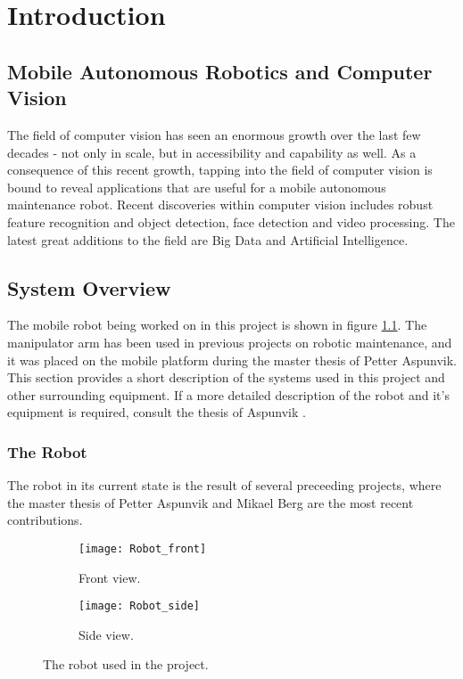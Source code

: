\chapter{Introduction}
\label{chp:introduction} 

\section{Mobile Autonomous Robotics and Computer Vision}

The field of computer vision has seen an enormous growth over the last few decades - not only in scale, but in accessibility and capability as well. As a consequence of this recent growth, tapping into the field of computer vision is bound to reveal applications that are useful for a mobile autonomous maintenance robot. Recent discoveries within computer vision includes robust feature recognition and object detection, face detection and video processing. The latest great additions to the field are Big Data and Artificial Intelligence.

\section{System Overview}

The mobile robot being worked on in this project is shown in figure \ref{fig:RobotFront}. The manipulator arm  has been used in previous projects on robotic maintenance, and it was placed on the mobile platform during the master thesis of Petter Aspunvik. This section provides a short description of the systems used in this project and other surrounding equipment. If a more detailed description of the robot and it's equipment is required, consult the thesis of Aspunvik \cite{aspunvik}.

\subsection{The Robot} 

The robot in its current state is the result of several preceeding projects, where the master thesis of Petter Aspunvik \cite{aspunvik} and Mikael Berg \cite{berg} are the most recent contributions. 

\begin{figure}
\centering
 \begin{subfigure}[b]{0.3\textwidth}
        \texttt{[image: Robot\_front]}
        \caption{Front view.}
        \label{fig:RobotFront}
    \end{subfigure}
    \begin{subfigure}[b]{0.65\textwidth}
        \texttt{[image: Robot\_side]}
        \caption{Side view.}
        \label{fig:RobotSide}
    \end{subfigure}
    \caption{\label{fig:RobotView}The robot used in the project.}
\end{figure}

